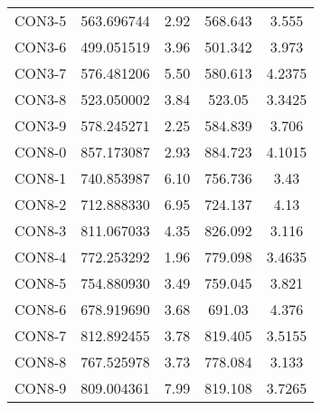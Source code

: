\begin{table}[ht]
\begin{tabular}{c c c c c}
CON3-5 & 563.696744 & 2.92 & 568.643 & 3.555 \\
CON3-6 & 499.051519 & 3.96 & 501.342 & 3.973 \\
CON3-7 & 576.481206 & 5.50 & 580.613 & 4.2375 \\
CON3-8 & 523.050002 & 3.84 & 523.05 & 3.3425 \\
CON3-9 & 578.245271 & 2.25 & 584.839 & 3.706 \\
CON8-0 & 857.173087 & 2.93 & 884.723 & 4.1015 \\
CON8-1 & 740.853987 & 6.10 & 756.736 & 3.43 \\
CON8-2 & 712.888330 & 6.95 & 724.137 & 4.13 \\
CON8-3 & 811.067033 & 4.35 & 826.092 & 3.116 \\
CON8-4 & 772.253292 & 1.96 & 779.098 & 3.4635 \\
CON8-5 & 754.880930 & 3.49 & 759.045 & 3.821 \\
CON8-6 & 678.919690 & 3.68 & 691.03 & 4.376 \\
CON8-7 & 812.892455 & 3.78 & 819.405 & 3.5155 \\
CON8-8 & 767.525978 & 3.73 & 778.084 & 3.133 \\
CON8-9 & 809.004361 & 7.99 & 819.108 & 3.7265 \\
[1ex]\hline
\end{tabular}
\label{table:nonlin}
\end{table} \clearpage
